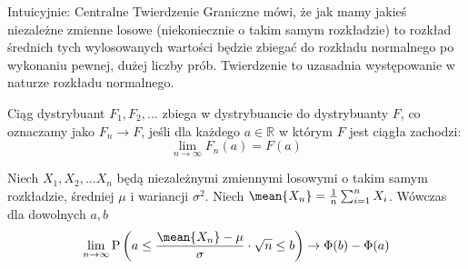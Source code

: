 Intuicyjnie: Centralne Twierdzenie Graniczne mówi, że jak mamy jakieś niezależne zmienne losowe (niekoniecznie o takim samym rozkładzie) to rozkład średnich tych wylosowanych wartości będzie zbiegać do rozkładu normalnego po wykonaniu pewnej, dużej liczby prób.
Twierdzenie to uzasadnia występowanie w naturze rozkładu normalnego.
\begin{definition}
    Ciąg dystrybuant \( F_1, F_2, ... \) zbiega w dystrybuancie do dystrybuanty \( F\), co oznaczamy jako \(F_n \to F \), jeśli dla każdego \(a \in \mathbb{R} \) w którym \( F \) jest ciągła zachodzi:
    \[
        \lim_{n \to \infty} F_n(a) = F(a)
    \]
\end{definition}

\begin{theorem}
    Niech \( X_1, X_2, ... X_n\) będą niezależnymi zmiennymi losowymi o takim samym rozkładzie, średniej \( \mu\) i wariancji \( \sigma^2\). Niech \( \mean{X_n} = \frac{1}{n}\sum_{i=1}^n X_i \). Wówczas dla dowolnych \(a, b\)
    \[
        \lim_{n \to \infty} \mathrm{P} \left( a \leq \frac{ \mean{X_n} - \mu}{\sigma} \cdot \sqrt{n} \leq b \right) \to \Phi(b) - \Phi(a)
    \]
\end{theorem}

